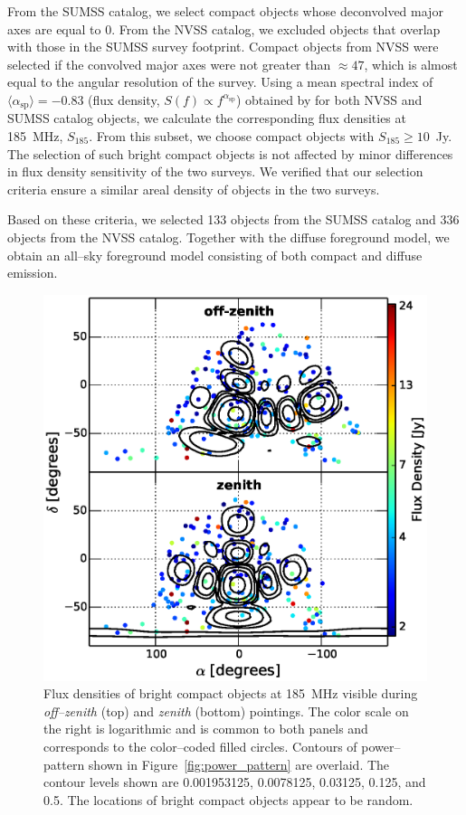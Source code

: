 \documentclass[preprint2,iop,numberedappendix]{emulateapj}
\begin{document}
From the SUMSS catalog, we select compact objects whose deconvolved major axes are equal to 0\arcsec. From the NVSS catalog, we excluded objects that overlap with those in the SUMSS survey footprint. Compact objects from NVSS were selected if the convolved major axes were not greater than $\approx 47$\arcsec, which is almost equal to the angular resolution of the survey. Using a mean spectral index of $\langle\alpha_\textrm{sp}\rangle=-0.83$ (flux density, $S(f)\propto f^{\alpha_\textrm{sp}}$) obtained by \citet{mau03} for both NVSS and SUMSS catalog objects, we calculate the corresponding flux densities at 185~MHz, $S_{185}$. From this subset, we choose compact objects with $S_{185}\geq 10$~Jy. The selection of such bright compact objects is not affected by minor differences in flux density sensitivity of the two surveys. We verified that our selection criteria ensure a similar areal density of objects in the two surveys. 

Based on these criteria, we selected 133 objects from the SUMSS catalog and 336 objects from the NVSS catalog. Together with the diffuse foreground model, we obtain an all--sky foreground model consisting of both compact and diffuse emission.

\begin{figure}[htb]
\centering
\includegraphics[width=\linewidth]{figures/v1_0/csm.eps}
\caption{Flux densities of bright compact objects at 185~MHz visible during {\it off--zenith} (top) and {\it zenith} (bottom) pointings. The color scale on the right is logarithmic and is common to both panels and corresponds to the color--coded filled circles. Contours of power--pattern shown in Figure~\ref{fig:power_pattern} are overlaid. The contour levels shown are 0.001953125, 0.0078125, 0.03125, 0.125, and 0.5. The locations of bright compact objects appear to be random.\label{fig:CSM}}
\end{figure}
\end{document}
